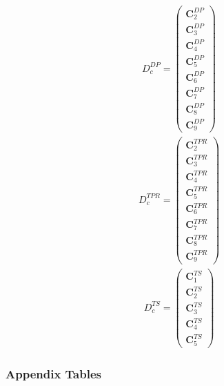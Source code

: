 \documentclass[11pt]{article}
\begin{document}
\begin{center}
{\[\begin{array}{ccc}
D_c^{DP} =
\left(
\begin{array}{c}
\mathbf{C}_2^{DP} \\
\mathbf{C}_3^{DP} \\
\mathbf{C}_4^{DP} \\
\mathbf{C}_5^{DP} \\
\mathbf{C}_6^{DP} \\
\mathbf{C}_7^{DP} \\
\mathbf{C}_8^{DP} \\
\mathbf{C}_9^{DP} 
\end{array}
\right)
\end{array}
\]
}
\vspace{2em}
\[
\begin{array}{ccc}

D_c^{TPR} =
\left(
\begin{array}{c}
\mathbf{C}_2^{TPR} \\
\mathbf{C}_3^{TPR} \\
\mathbf{C}_4^{TPR} \\
\mathbf{C}_5^{TPR} \\
\mathbf{C}_6^{TPR} \\
\mathbf{C}_7^{TPR} \\
\mathbf{C}_8^{TPR} \\
\mathbf{C}_9^{TPR} 
\end{array}
\right)

\end{array}
\]
\vspace{2em}
\[
\begin{array}{ccc}

D_c^{TS} =
\left(
\begin{array}{c}
\mathbf{C}_1^{TS} \\
\mathbf{C}_2^{TS} \\
\mathbf{C}_3^{TS} \\
\mathbf{C}_4^{TS} \\
\mathbf{C}_5^{TS} 
\end{array}
\right)

\end{array}
\]
\end{center}

\newpage
\subsubsection{Appendix Tables}
\end{document}
